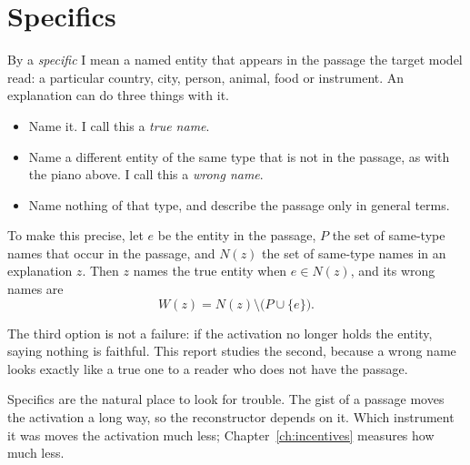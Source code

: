 \section{Specifics}

By a \emph{specific} I mean a named entity that appears in the passage the target model read: a particular
country, city, person, animal, food or instrument. An explanation can do three things with it.

\begin{itemize}
\item Name it. I call this a \emph{true name}.
\item Name a different entity of the same type that is not in the passage, as with the piano above. I call
this a \emph{wrong name}.
\item Name nothing of that type, and describe the passage only in general terms.
\end{itemize}

To make this precise, let $e$ be the entity in the passage, $P$ the set of same-type names that occur in the
passage, and $N(z)$ the set of same-type names in an explanation $z$. Then $z$ names the true entity when
$e \in N(z)$, and its wrong names are
\begin{equation}
W(z) = N(z) \setminus \bigl(P \cup \{e\}\bigr).
\label{eq:wrong}
\end{equation}

The third option is not a failure: if the activation no longer holds the entity, saying nothing is
faithful. This report studies the second, because a wrong name looks exactly like a true one to a reader
who does not have the passage.

Specifics are the natural place to look for trouble. The gist of a passage moves the activation a long way,
so the reconstructor depends on it. Which instrument it was moves the activation much less;
Chapter~\ref{ch:incentives} measures how much less.

